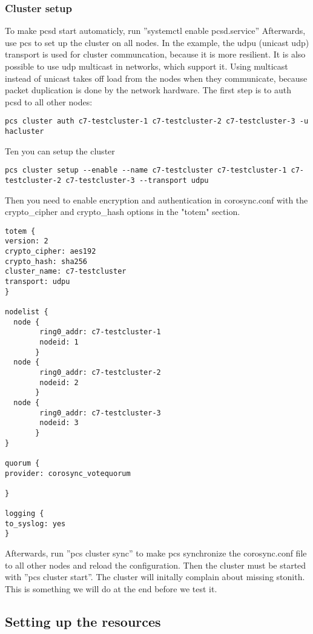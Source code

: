 \subsubsection{Cluster setup}
To make pcsd start automaticly, run ''systemctl enable pcsd.service''
Afterwards, use pcs to set up the cluster on all nodes. 
In the example, the udpu (unicast udp) transport is used for cluster communcation, because it is more resilient.
It is also possible to use udp multicast in networks, which support it. Using multicast
instead of unicast takes off load from the nodes when they communicate, because packet duplication is done by the network hardware.
The first step is to auth pcsd to all other nodes:
\begin{lstlisting}
pcs cluster auth c7-testcluster-1 c7-testcluster-2 c7-testcluster-3 -u hacluster
\end{lstlisting}
Ten you can setup the cluster
\begin{lstlisting}
pcs cluster setup --enable --name c7-testcluster c7-testcluster-1 c7-testcluster-2 c7-testcluster-3 --transport udpu
\end{lstlisting}
Then you need to enable encryption and authentication in corosync.conf with the crypto_cipher and crypto_hash
options in the "totem" section.
\begin{lstlisting}
totem {
version: 2
crypto_cipher: aes192
crypto_hash: sha256
cluster_name: c7-testcluster
transport: udpu
}

nodelist {
  node {
        ring0_addr: c7-testcluster-1
        nodeid: 1
       }
  node {
        ring0_addr: c7-testcluster-2
        nodeid: 2
       }
  node {
        ring0_addr: c7-testcluster-3
        nodeid: 3
       }
}

quorum {
provider: corosync_votequorum

}

logging {
to_syslog: yes
}
\end{lstlisting}
Afterwards, run ''pcs cluster sync'' to make pcs synchronize the corosync.conf file
to all other nodes and reload the configuration.
Then the cluster must be started with ''pcs cluster start''.
The cluster will initally complain about missing stonith. This is something we will do at the end
before we test it.
\subsection{Setting up the resources}

